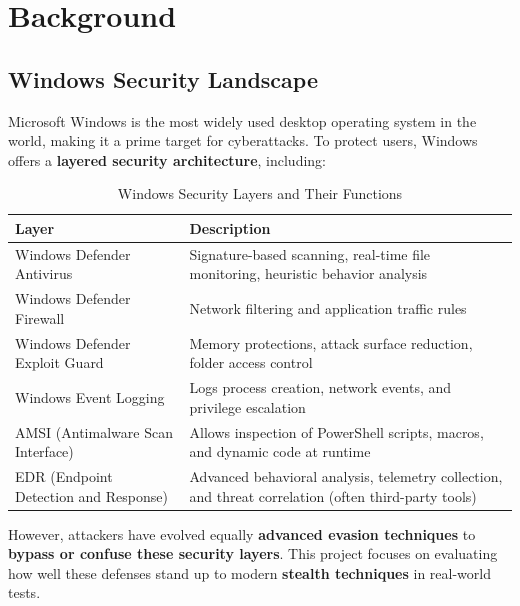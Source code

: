 \setcounter{secnumdepth}{-1}

\section{Background}
\subsection{Windows Security Landscape} 
Microsoft Windows is the most widely used desktop operating system in the world, making it a prime target for cyberattacks. 
To protect users, Windows offers a \textbf{layered security architecture}, including:

\begin{table}[H]
    \centering
    \begin{tabular}{|p{5cm}|p{10cm}|}
        \hline
        \textbf{Layer} & \textbf{Description} \\
        \hline
        Windows Defender Antivirus & Signature-based scanning, real-time file monitoring, heuristic behavior analysis \\
        \hline
        Windows Defender Firewall & Network filtering and application traffic rules \\
        \hline
        Windows Defender Exploit Guard & Memory protections, attack surface reduction, folder access control \\
        \hline
        Windows Event Logging & Logs process creation, network events, and privilege escalation \\
        \hline
        AMSI (Antimalware Scan Interface) & Allows inspection of PowerShell scripts, macros, and dynamic code at runtime \\
        \hline
        EDR (Endpoint Detection and Response) & Advanced behavioral analysis, telemetry collection, and threat correlation (often third-party tools) \\
        \hline
    \end{tabular}
    \caption{Windows Security Layers and Their Functions}
    \label{tab:windows_security_layers}
\end{table}

However, attackers have evolved equally \textbf{advanced evasion techniques} to \textbf{bypass or confuse these security layers}. This project focuses on evaluating how well these defenses stand up to modern \textbf{stealth techniques} in real-world tests.

